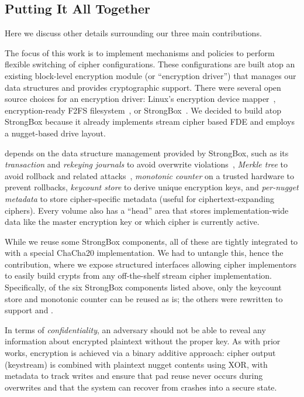 \subsection{Putting It All Together}\label{subsec:des-summary}

Here we discuss other details surrounding our three main contributions.


 The focus of this work is to implement
mechanisms and policies to perform flexible switching of cipher configurations.
These configurations are built atop an existing block-level encryption module
(or ``encryption driver'') that manages our data structures and provides
cryptographic support. There were several open source choices for an encryption
driver: Linux's encryption device mapper~\cite{dmcrypt,DmC-Android},
encryption-ready F2FS filesystem~\cite{F2FS}, or StrongBox~\cite{StrongBox}. We
decided to build \sys atop StrongBox because it already implements stream cipher
based FDE and employs a nugget-based drive layout.

\sys depends on the data structure management provided by StrongBox, such as its
{\em transaction} and {\em rekeying journals} to avoid overwrite
violations~\cite{StrongBox}, {\em Merkle tree} to avoid rollback and related
attacks~\cite{StrongBox}, {\em monotonic counter} on a trusted hardware to
prevent rollbacks, {\em keycount store} to derive unique encryption keys, and
{\em per-nugget metadata} to store cipher-specific metadata (useful for
ciphertext-expanding ciphers). Every \sys volume also has a ``head'' area that
stores implementation-wide data like the master encryption key or which cipher
is currently active.

While we reuse some StrongBox components, all of these are tightly integrated to
with a special ChaCha20 implementation. We had to untangle this, hence the \sysB
contribution, where we expose structured interfaces allowing cipher implementors
to easily build crypts from any off-the-shelf stream cipher implementation.
Specifically, of the six StrongBox components listed above, only the keycount
store and monotonic counter can be reused as is; the others were rewritten to
support \sysA and \sysB.


 In terms of {\em confidentiality}, an
adversary should not be able to reveal any information about encrypted plaintext
without the proper key. As with prior works, encryption is achieved via a binary
additive approach: cipher output (keystream) is combined with plaintext nugget
contents using XOR, with metadata to track writes and ensure that pad reuse
never occurs during overwrites and that the system can recover from crashes into
a secure state.

